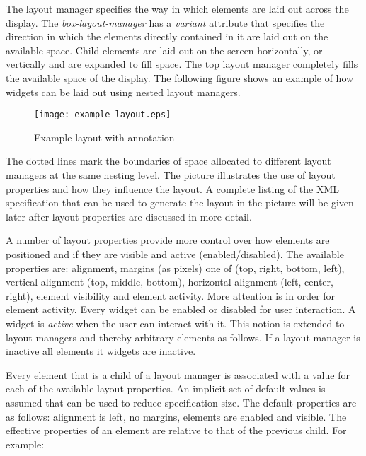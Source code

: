 \documentclass{article}
\begin{document}
   \noindent The layout manager specifies the way in which elements are laid
   out across the display.  The \textit{box-layout-manager} has a
   \textit{variant} attribute that specifies the direction in which the
   elements directly contained in it are laid out on the available space.
   Child elements are laid out on the screen horizontally, or vertically and
   are expanded to fill space. The top layout manager completely fills the
   available space of the display. The following figure shows an example of how
   widgets can be laid out using nested layout managers.

   \begin{figure}[H]
    \begin{center}
     \texttt{[image: example\_layout.eps]}
    \end{center}
    \caption{Example layout with annotation}
   \end{figure}

   \noindent The dotted lines mark the boundaries of space allocated to
   different layout managers at the same nesting level. The picture illustrates
   the use of layout properties and how they influence the layout. A complete
   listing of the XML specification that can be used to generate the layout in
   the picture will be given later after layout properties are discussed in
   more detail.

   A number of layout properties provide more control over how elements are
   positioned and if they are visible and active (enabled/disabled). The
   available properties are: alignment, margins (as pixels) one of (top, right,
   bottom, left), vertical alignment (top, middle, bottom),
   horizontal-alignment (left, center, right), element visibility and element
   activity.
   More attention is in order for element activity. Every widget can be
   enabled or disabled for user interaction. A widget is \textit{active} when
   the user can interact with it. This notion is extended to layout managers
   and thereby arbitrary elements as follows. If a layout manager is inactive
   all elements it widgets are inactive.
   
   Every element that is a child of a layout manager is associated with a value
   for each of the available layout properties. An implicit set of default
   values is assumed that can be used to reduce specification size.
   The default properties are as follows: alignment is left, no margins,
   elements are enabled and visible. The effective properties of an element are
   relative to that of the previous child. For example:
\end{document}
